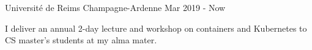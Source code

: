 


\begin{cventries}

\cventry
{} %
{Université de Reims Champagne-Ardenne} %
{} %
{Mar 2019 - Now} %
{ %
\begin{cvitems}
\item {I deliver an annual 2-day lecture and workshop on containers and Kubernetes to CS master's students at my alma mater.}
\end{cvitems}
}












\end{cventries}